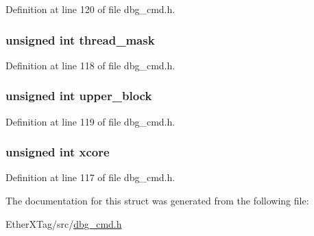 Definition at line 120 of file dbg\-\_\-cmd.\-h.

\hypertarget{structdbg__cmd__type__write__regs_a2cafb0001a9bc70c6466b0d0ab295c0a}{
\subsubsection[{thread\-\_\-mask}]{\setlength{\rightskip}{0pt plus 5cm}unsigned int thread\-\_\-mask}}\label{structdbg__cmd__type__write__regs_a2cafb0001a9bc70c6466b0d0ab295c0a}


Definition at line 118 of file dbg\-\_\-cmd.\-h.

\hypertarget{structdbg__cmd__type__write__regs_a78e2cce5b7b32d6e7d7f5b1cb281f39f}{
\subsubsection[{upper\-\_\-block}]{\setlength{\rightskip}{0pt plus 5cm}unsigned int upper\-\_\-block}}\label{structdbg__cmd__type__write__regs_a78e2cce5b7b32d6e7d7f5b1cb281f39f}


Definition at line 119 of file dbg\-\_\-cmd.\-h.

\hypertarget{structdbg__cmd__type__write__regs_a78357326dd562d441c3c73f5676ac638}{
\subsubsection[{xcore}]{\setlength{\rightskip}{0pt plus 5cm}unsigned int xcore}}\label{structdbg__cmd__type__write__regs_a78357326dd562d441c3c73f5676ac638}


Definition at line 117 of file dbg\-\_\-cmd.\-h.



The documentation for this struct was generated from the following file\-:\begin{DoxyCompactItemize}
\item 
Ether\-X\-Tag/src/\hyperlink{dbg__cmd_8h}{dbg\-\_\-cmd.\-h}\end{DoxyCompactItemize}
